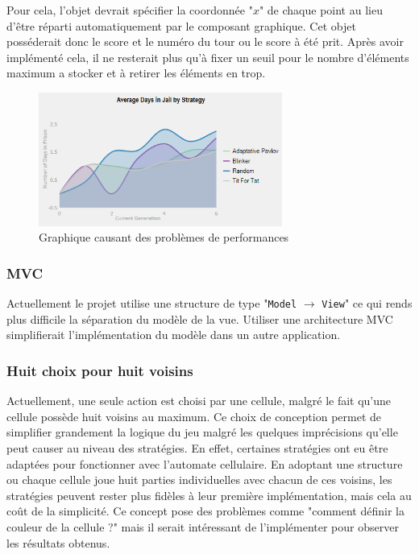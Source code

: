 \documentclass[a4paper, french]{article}
\begin{document}
Pour cela, l'objet devrait spécifier la coordonnée "$x$" de chaque point au lieu d'être réparti automatiquement par le composant graphique. Cet objet posséderait donc le score et le numéro du tour ou le score à été prit. Après avoir implémenté cela, il ne resterait plus qu'à fixer un seuil pour le nombre d'éléments maximum a stocker et à retirer les éléments en trop.

\begin{figure}[htp]
    \centering
    \includegraphics[width=8cm]{graph.png}
    \caption{Graphique causant des problèmes de performances}
\end{figure}

\subsubsection{MVC}
Actuellement le projet utilise une structure de type "\texttt{Model} $\rightarrow{}$ \texttt{View}" ce qui rends plus difficile la séparation du modèle de la vue. Utiliser une architecture MVC simplifierait l'implémentation du modèle dans un autre application.

\subsubsection{Huit choix pour huit voisins}
Actuellement, une seule action est choisi par une cellule, malgré le fait qu'une cellule possède huit voisins au maximum. Ce choix de conception permet de simplifier grandement la logique du jeu malgré les quelques imprécisions qu'elle peut causer au niveau des stratégies. En effet, certaines stratégies ont eu être adaptées pour fonctionner avec l'automate cellulaire. En adoptant une structure ou chaque cellule joue huit parties individuelles avec chacun de ces voisins, les stratégies peuvent rester plus fidèles à leur première implémentation, mais cela au coût de la simplicité. Ce concept pose des problèmes comme "comment définir la couleur de la cellule ?" mais il serait intéressant de l'implémenter pour observer les résultats obtenus.
\end{document}
